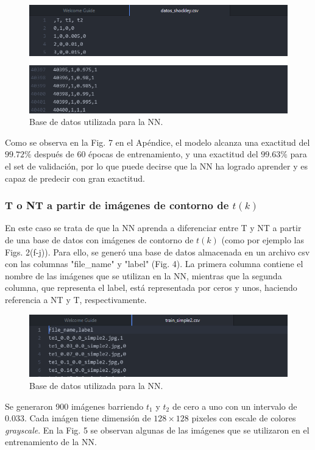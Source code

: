 \documentclass{article}
\begin{document}
\begin{figure}[th!]
\centering
   \includegraphics[width=1.\textwidth]{datos_shockley.png}
   \caption{Base de datos utilizada para la NN.}
\end{figure}

Como se observa en la Fig. 7 en el Apéndice, el modelo alcanza una exactitud del $99.72\%$ después de 60 épocas de entrenamiento, y una exactitud del $99.63\%$ para el set de validación, por lo que puede decirse que la NN ha logrado aprender y es capaz de predecir con gran exactitud.

\subsubsection{T o NT a partir de imágenes de contorno de $t(k)$}
En este caso se trata de que la NN aprenda a diferenciar entre T y NT a partir de una base de datos con imágenes de contorno de $t(k)$ (como por ejemplo las Figs. 2(f-j)). Para ello, se generó una base de datos almacenada en un archivo csv con las columnas "file\_name" y "label" (Fig. 4). La primera columna contiene el nombre de las imágenes que se utilizan en la NN, mientras que la segunda columna, que representa el label, está representada por ceros y unos, haciendo referencia a NT y T, respectivamente. 

\begin{figure}[th!]
\centering
   \includegraphics[width=1.\textwidth]{datos_imagenes_shockley.png}
   \caption{Base de datos utilizada para la NN.}
\end{figure}

Se generaron 900 imágenes barriendo $t_1$ y $t_2$ de cero a uno con un intervalo de 0.033. Cada imágen tiene dimensión de $128\times128$ pixeles con escale de colores \textit{grayscale}. En la Fig. 5 se observan algunas de las imágenes que se utilizaron en el entrenamiento de la NN.
\end{document}
